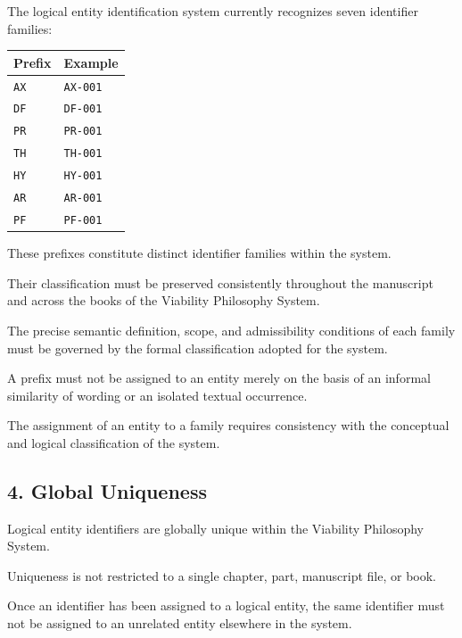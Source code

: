 The logical entity identification system
currently recognizes seven identifier
families:

\begin{center}
\begin{tabular}{ll}
    \toprule
    \textbf{Prefix} & \textbf{Example} \\
    \midrule
    \texttt{AX} & \texttt{AX-001} \\
    \texttt{DF} & \texttt{DF-001} \\
    \texttt{PR} & \texttt{PR-001} \\
    \texttt{TH} & \texttt{TH-001} \\
    \texttt{HY} & \texttt{HY-001} \\
    \texttt{AR} & \texttt{AR-001} \\
    \texttt{PF} & \texttt{PF-001} \\
    \bottomrule
\end{tabular}
\end{center}

These prefixes constitute distinct
identifier families within the system.

Their classification must be preserved
consistently throughout the manuscript
and across the books of the Viability
Philosophy System.

The precise semantic definition, scope,
and admissibility conditions of each
family must be governed by the formal
classification adopted for the system.

A prefix must not be assigned to an
entity merely on the basis of an informal
similarity of wording or an isolated
textual occurrence.

The assignment of an entity to a family
requires consistency with the conceptual
and logical classification of the system.


\subsection*{4. Global Uniqueness}

Logical entity identifiers are globally
unique within the Viability Philosophy
System.

Uniqueness is not restricted to a single
chapter, part, manuscript file, or book.

Once an identifier has been assigned
to a logical entity, the same identifier
must not be assigned to an unrelated
entity elsewhere in the system.

